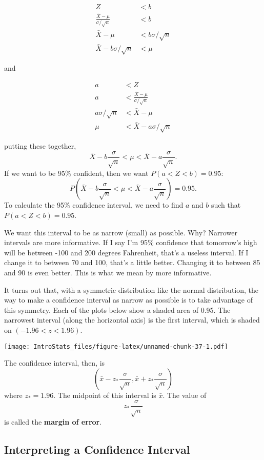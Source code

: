 \documentclass[
]{book}
\begin{document}
\[
\begin{aligned}
Z &< b\\
\frac{\bar{X}-\mu}{\sigma/\sqrt{n}} &< b\\
\bar{X}-\mu &< b\sigma/\sqrt{n} \\
\bar{X}-b\sigma/\sqrt{n} &< \mu 
\end{aligned}
\]

and

\[
\begin{aligned}
a &< Z  \\
a &< \frac{\bar{X}-\mu}{\sigma/\sqrt{n}} \\
a\sigma/\sqrt{n} &< \bar{X}-\mu \\
\mu &< \bar{X}-a\sigma/\sqrt{n}
\end{aligned}
\]

putting these together, \[ \bar{X}-b\frac{\sigma}{\sqrt{n}} < \mu <  \bar{X}-a\frac{\sigma}{\sqrt{n}}.\] If we want to be 95\% confident, then we want \(P(a < Z < b)=0.95\): \[P\left(\bar{X}-b\frac{\sigma}{\sqrt{n}} < \mu <  \bar{X}-a\frac{\sigma}{\sqrt{n}}\right) = 0.95.\] To calculate the 95\% confidence interval, we need to find \(a\) and \(b\) such that \(P(a < Z < b)=0.95\).

We want this interval to be as narrow (small) as possible. Why? Narrower intervals are more informative. If I say I'm 95\% confidence that tomorrow's high will be between -100 and 200 degrees Fahrenheit, that's a useless interval. If I change it to between 70 and 100, that's a little better. Changing it to between 85 and 90 is even better. This is what we mean by more informative.

It turns out that, with a symmetric distribution like the normal distribution, the way to make a confidence interval as narrow as possible is to take advantage of this symmetry. Each of the plots below show a shaded area of 0.95. The narrowest interval (along the horizontal axis) is the first interval, which is shaded on \((-1.96 < z < 1.96)\).

\texttt{[image: IntroStats\_files/figure-latex/unnamed-chunk-37-1.pdf]}

The confidence interval, then, is \[\left(\bar{x} - z_*\frac{\sigma}{\sqrt{n}}, \bar{x} + z_*\frac{\sigma}{\sqrt{n}}\right)\] where \(z_* = 1.96\). The midpoint of this interval is \(\bar{x}\). The value of \[z_*\frac{\sigma}{\sqrt{n}}\] is called the \textbf{margin of error}.

\hypertarget{interpreting-a-confidence-interval}{%
\subsection{Interpreting a Confidence Interval}\label{interpreting-a-confidence-interval}}
\end{document}
